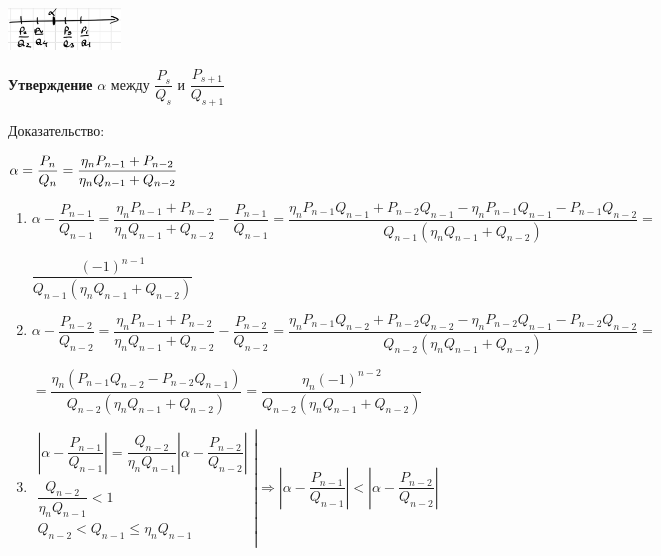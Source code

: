 \documentclass[12pt]{article}
\begin{document}
\includegraphics[width=30mm]{image.png}

\textbf{Утверждение} $\alpha$ между $\dfrac{P_s}{Q_s}$ и $\dfrac{P_{s+1}}{Q_{s+1}} $

Доказательство:

$\alpha = \dfrac{P_n}{Q_n} = \dfrac{\eta_n P_{n-1} + P_{n-2}}{\eta_n Q_{n-1} + Q_{n-2}} \vspace{2 ex}$

\begin{enumerate}
    \item
          $\alpha - \dfrac{P_{n-1}}{Q_{n-1}} = \dfrac{\eta_n P_{n-1} + P_{n-2}}{\eta_n Q_{n-1} + Q_{n-2}} - \dfrac{P_{n-1}}{Q_{n-1}}
              = \dfrac{\eta_n P_{n-1} Q_{n-1} + P_{n-2} Q_{n-1} - \eta_n P_{n-1} Q_{n-1} - P_{n-1} Q_{n-2}}{ Q_{n-1}(\eta_n Q_{n-1} + Q_{n-2})} =$

          $\dfrac{(-1)^{n-1}}{Q_{n-1}(\eta_n Q_{n-1} + Q_{n-2})}$

    \item $\alpha - \dfrac{P_{n-2}}{Q_{n-2}} = \dfrac{\eta_n P_{n-1} + P_{n-2}}{\eta_n Q_{n-1} + Q_{n-2}} - \dfrac{P_{n-2}}{Q_{n-2}}
              = \dfrac{\eta_n P_{n-1} Q_{n-2} + P_{n-2} Q_{n-2} - \eta_n P_{n-2} Q_{n-1} - P_{n-2} Q_{n-2}}{ Q_{n-2}(\eta_n Q_{n-1} + Q_{n-2})} = $

          $ = \dfrac{\eta_n (P_{n-1} Q_{n-2} - P_{n-2} Q_{n-1})}{Q_{n-2}(\eta_n Q_{n-1} + Q_{n-2}) }
              = \dfrac{\eta_n (-1)^{n-2}}{Q_{n-2}(\eta_n Q_{n-1} + Q_{n-2})}$

    \item $\left.\begin{array}{l}
                  \left|\alpha - \dfrac{P_{n-1}}{Q_{n-1}}\right| = \dfrac{Q_{n-2}}{\eta_n Q_{n-1}} \left|\alpha - \dfrac{P_{n-2}}{Q_{n-2}}\right| \\
                  \dfrac{Q_{n-2}}{\eta_n Q_{n-1}} < 1                                                                                             \\
                  Q_{n-2} < Q_{n-1} \leq \eta_n Q_{n-1}                                                                                           \\
              \end{array}\right|\Rightarrow \left|\alpha - \dfrac{P_{n-1}}{Q_{n-1}}\right| < \left|\alpha - \dfrac{P_{n-2}}{Q_{n-2}}\right|$
\end{enumerate}
\end{document}
